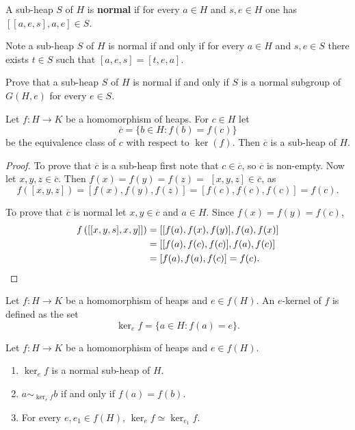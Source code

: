 \documentclass{svmult}
\begin{document}
\begin{definition}
    A sub-heap $S$ of $H$ is \textbf{normal} if 
    for every $a\in H$ and $s,e\in H$ one has 
    $[[a,e,s],a,e]\in S$.  
\end{definition}

Note a sub-heap $S$ of $H$ is normal if and only if 
for every $a\in H$ and $s,e\in S$ there exists 
$t\in S$ such that $[a,e,s]=[t,e,a]$.
    
\begin{exercise}
    Prove that a sub-heap $S$ of $H$ is normal if and only if 
    $S$ is a normal subgroup of $G(H,e)$ for every $e\in S$. 
\end{exercise}

\begin{theorem}
    Let $f\colon H\to K$ be a homomorphism of heaps. For $c\in H$
    let 
    \[
    \overline{c}=\{b\in H:f(b)=f(c)\}
    \]
    be the equivalence class of $c$ with respect to $\ker(f)$. 
    Then $\overline{c}$ is a sub-heap of $H$.  
\end{theorem}

\begin{proof}
    To prove that $\overline{c}$ is a sub-heap first note that 
    $c\in\overline{c}$, so $\overline{c}$ is non-empty. 
    Now let $x,y,z\in\overline{c}$. 
    Then $f(x)=f(y)=f(z)=$ 
    $[x,y,z]\in\overline{c}$, as
    \[
    f([x,y,z])=[f(x),f(y),f(z)]=[f(c),f(c),f(c)]=f(c).
    \]
    
    To prove that $\overline{c}$ is normal let $x,y\in\overline{c}$ and $a\in H$. 
    Since $f(x)=f(y)=f(c)$, 
    \begin{align*}
        f\left(\left[[x,y,s],x,y]\right]\right)&=\left[[f(a),f(x),f(y)],f(a),f(x)\right]\\ 
        &=\left[[f(a),f(c),f(c)],f(a),f(c)\right]\\
        &=[f(a),f(a),f(c)]=f(c).\qedhere
    \end{align*}
\end{proof}

\begin{definition}
    Let $f\colon H\to K$ be a homomorphism of heaps and $e\in f(H)$. 
    An $e$-kernel of $f$ is defined as the set
    \[
    \ker_ef=\{a\in H:f(a)=e\}.
    \]
\end{definition}

\begin{theorem}
    Let $f\colon H\to K$ be a homomorphism of heaps and $e\in f(H)$. 
    \begin{enumerate}
        \item $\ker_ef$ is a normal sub-heap of $H$. 
        \item $a\sim_{\ker_ef}b$ if and only if $f(a)=f(b)$. 
        \item For every $e,e_1\in f(H)$, $\ker_ef\simeq\ker_{e_1}f$. 
    \end{enumerate}
\end{theorem}
\end{document}
